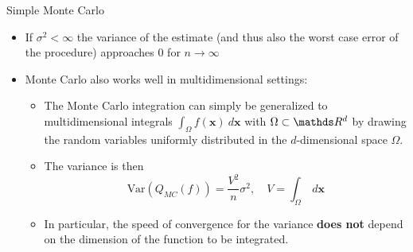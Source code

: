 \begin{vbframe}{Simple Monte Carlo}
\begin{itemize}
\framebreak


\item If $\sigma^2 < \infty$ the variance of the estimate (and thus also the worst case error of the procedure) approaches $0$ for $n \to \infty$
\item Monte Carlo also works well in multidimensional settings:
\vspace*{-0.2cm}
\begin{itemize}
\item The Monte Carlo integration can simply be generalized to multidimensional integrals $\int_\Omega f(\bm{x}) ~ d\bm{x}$ with $\Omega \subset \R^d$ by drawing the random variables uniformly distributed in the $d$-dimensional space $\Omega$.
\item The variance is then
$$
    \text{Var}\left(Q_{MC}(f)\right) = \frac{V^2}{n} \sigma^2, \quad V = \int_\Omega ~ d\bm{x}
$$
\item In particular, the speed of convergence for the variance \textbf{does not} depend on the dimension of the function to be integrated.
\end{itemize}
\end{itemize}
\end{vbframe}



